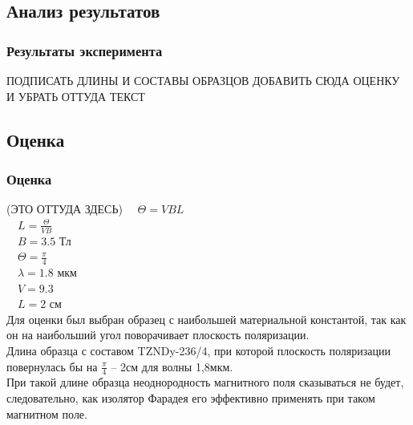 \documentclass[10pt,pdf,hyperref={unicode}, dvipsnames, handout]{beamer}
\begin{document}
\begin{frame}[t]
	\subsection{Анализ результатов}
	\frametitle{Результаты эксперимента}
	\begin{figure}[tb]
		\centering
		\hspace{5em}
	\end{figure}
	ПОДПИСАТЬ ДЛИНЫ И СОСТАВЫ ОБРАЗЦОВ
	ДОБАВИТЬ СЮДА ОЦЕНКУ И УБРАТЬ ОТТУДА ТЕКСТ
	
\end{frame}
\begin{frame}
	\subsection{Оценка}
	\frametitle{Оценка}
	(ЭТО ОТТУДА ЗДЕСЬ)
		$\quad \Theta=VBL$\\
		$\quad L=\frac{\Theta}{VB}$\\
		$\quad B=3.5$ Тл\\
		$\quad \Theta=\frac{\pi}{4}$\\
		$\quad \lambda=1.8$ мкм\\
		$\quad V=9.3$ \\
		$\quad L=2$ см\\
	Для оценки был выбран образец с наибольшей материальной константой, так как он на наибольший угол поворачивает плоскость поляризации.\\

	Длина образца с составом TZNDy-236/4, при которой плоскость поляризации повернулась бы на $\frac{\pi}{4}$ -- 2см для волны 1,8мкм.\\	

	При такой длине образца неоднородность магнитного поля сказываться не будет, следовательно, как изолятор Фарадея его эффективно применять при таком магнитном поле.
	
\end{frame}
\end{document}
